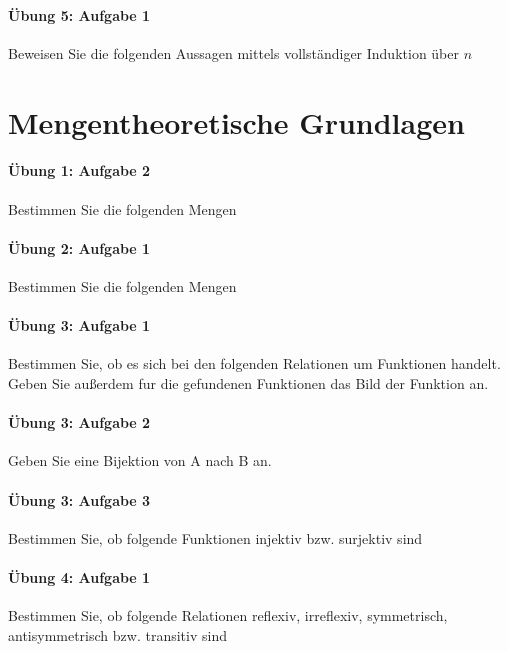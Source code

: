 \documentclass
[
  draft    = true,
  fontsize = 11pt,
  parskip  = half-,
  BCOR     = 0pt,
  DIV      = 11,
  ngerman,
  dvipsnames
]
{scrartcl}
\begin{document}
\paragraph{Übung 5: Aufgabe 1}
Beweisen Sie die folgenden Aussagen mittels vollständiger Induktion über
$n$

\section{Mengentheoretische Grundlagen}

\paragraph{Übung 1: Aufgabe 2}
Bestimmen Sie die folgenden Mengen

\paragraph{Übung 2: Aufgabe 1}
Bestimmen Sie die folgenden Mengen

\paragraph{Übung 3: Aufgabe 1}
Bestimmen Sie, ob es sich bei den folgenden Relationen um Funktionen
handelt. Geben Sie außerdem fur die gefundenen Funktionen das Bild der
Funktion an.

\paragraph{Übung 3: Aufgabe 2}
Geben Sie eine Bijektion von A nach B an.

\paragraph{Übung 3: Aufgabe 3}
Bestimmen Sie, ob folgende Funktionen injektiv bzw. surjektiv sind

\paragraph{Übung 4: Aufgabe 1}
Bestimmen Sie, ob folgende Relationen reflexiv, irreflexiv, symmetrisch,
antisymmetrisch bzw. transitiv sind
\end{document}

